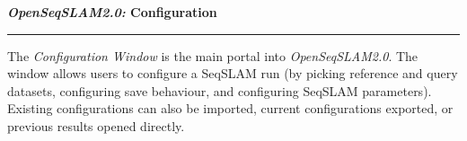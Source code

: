 \centerline{\textbf{\textit{OpenSeqSLAM2.0:} Configuration}}
\noindent\rule{\textwidth}{2pt}
\bigskip
\parbox{\textwidth}{The \textit{Configuration Window} is the main portal into \textit{OpenSeqSLAM2.0}. The window allows users to configure a SeqSLAM run (by picking reference and query datasets, configuring save behaviour, and configuring SeqSLAM parameters). Existing configurations can also be imported, current configurations exported, or previous results opened directly.}
\bigskip
